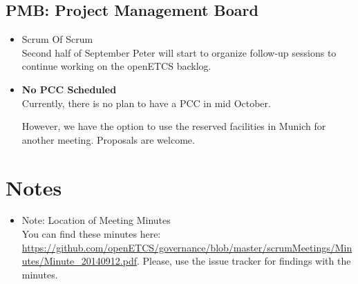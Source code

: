 \documentclass[a4paper, 11pt]{article}
\begin{document}
\subsection{PMB: Project Management Board}
\begin{itemize}
\item Scrum Of Scrum\\
Second half of September Peter will start to organize follow-up sessions to continue working on the openETCS backlog.\\

\item \textbf{No PCC Scheduled}\\
Currently, there is no plan to have a PCC in mid October. 

However, we have the option to use the reserved facilities in  Munich for another meeting. Proposals are welcome.

\end{itemize}

\section{Notes}
\begin{itemize}

\item Note: Location of Meeting Minutes\\
You can find these minutes here: \url{https://github.com/openETCS/governance/blob/master/scrumMeetings/Minutes/Minute_20140912.pdf}. Please, use the issue tracker for findings with the minutes.

\end{itemize}
\end{document}
